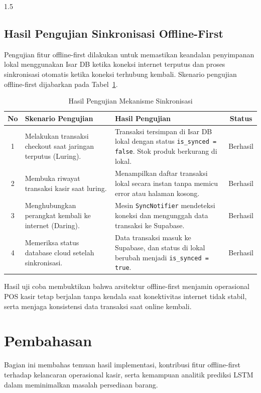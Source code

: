 \documentclass[12pt, a4paper, onecolumn, oneside]{report}
\begin{document}
\begin{spacing}{1.5}
\subsection{Hasil Pengujian Sinkronisasi Offline-First}

Pengujian fitur offline-first dilakukan untuk memastikan keandalan penyimpanan lokal menggunakan Isar DB ketika koneksi internet terputus dan proses sinkronisasi otomatis ketika koneksi terhubung kembali. Skenario pengujian offline-first dijabarkan pada Tabel~\ref{tab:hasil_sync}.

\begin{table}[H]
\centering
\caption{Hasil Pengujian Mekanisme Sinkronisasi}
\label{tab:hasil_sync}
\begin{tabularx}{\textwidth}{|c|X|X|c|}
\hline
\textbf{No} & \textbf{Skenario Pengujian} & \textbf{Hasil Pengujian} & \textbf{Status} \\
\hline
1 & Melakukan transaksi checkout saat jaringan terputus (Luring). & Transaksi tersimpan di Isar DB lokal dengan status \texttt{is\_synced = false}. Stok produk berkurang di lokal. & Berhasil \\
\hline
2 & Membuka riwayat transaksi kasir saat luring. & Menampilkan daftar transaksi lokal secara instan tanpa memicu error atau halaman kosong. & Berhasil \\
\hline
3 & Menghubungkan perangkat kembali ke internet (Daring). & Mesin \texttt{SyncNotifier} mendeteksi koneksi dan mengunggah data transaksi ke Supabase. & Berhasil \\
\hline
4 & Memeriksa status database cloud setelah sinkronisasi. & Data transaksi masuk ke Supabase, dan status di lokal berubah menjadi \texttt{is\_synced = true}. & Berhasil \\
\hline
\end{tabularx}
\end{table}

Hasil uji coba membuktikan bahwa arsitektur offline-first menjamin operasional POS kasir tetap berjalan tanpa kendala saat konektivitas internet tidak stabil, serta menjaga konsistensi data transaksi saat online kembali.

\section{Pembahasan}

Bagian ini membahas temuan hasil implementasi, kontribusi fitur offline-first terhadap kelancaran operasional kasir, serta kemampuan analitik prediksi LSTM dalam meminimalkan masalah persediaan barang.


\end{spacing}
\end{document}
